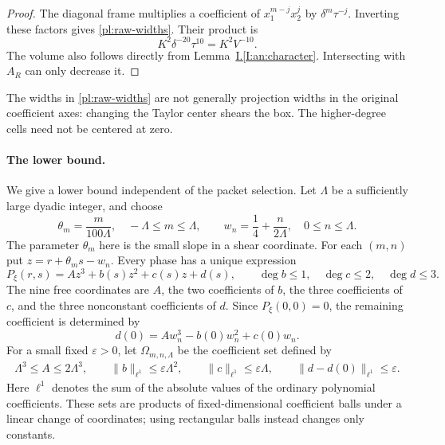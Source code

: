 \documentclass[11pt]{amsart}
\theoremstyle{definition}
\theoremstyle{remark}
\numberwithin{equation}{section}
\newcommand{\partIref}[1]{\hyperref[I:#1]{I.\ref*{I:#1}}}
\begin{document}
\begin{proof}
The diagonal frame multiplies a coefficient of $x_1^{m-j}x_2^j$ by $\delta^m\tau^{-j}$. Inverting these factors gives \eqref{pl:raw-widths}. Their product is
\begin{equation}\label{pl:width-product}
K^2\delta^{-20}\tau^{10}=K^2V^{-10}.
\end{equation}
The volume also follows directly from Lemma~\partIref{an:character}. Intersecting with $A_R$ can only decrease it.
\end{proof}

The widths in \eqref{pl:raw-widths} are not generally projection widths in the original coefficient axes: changing the Taylor center shears the box. The higher-degree cells need not be centered at zero.

\paragraph{The lower bound.}\label{pl:sharpness}
We give a lower bound independent of the packet selection. Let $\Lambda$ be a sufficiently large dyadic integer, and choose
\begin{equation}\label{pl:lower-grids}
\theta_m=\frac{m}{100\Lambda},\quad -\Lambda\le m\le\Lambda,
\qquad w_n=\frac14+\frac{n}{2\Lambda},\quad0\le n\le\Lambda.
\end{equation}
The parameter $\theta_m$ here is the small slope in a shear coordinate. For each $(m,n)$ put $z=r+\theta_ms-w_n$. Every phase has a unique expression
\begin{equation}\label{pl:lower-normal-form}
P_\xi(r,s)=Az^3+b(s)z^2+c(s)z+d(s),
\qquad \deg b\le1,\quad\deg c\le2,\quad\deg d\le3.
\end{equation}
The nine free coordinates are $A$, the two coefficients of $b$, the three coefficients of $c$, and the three nonconstant coefficients of $d$. Since $P_\xi(0,0)=0$, the remaining coefficient is determined by
\[
d(0)=Aw_n^3-b(0)w_n^2+c(0)w_n.
\]
For a small fixed $\varepsilon>0$, let $\Omega_{m,n,\Lambda}$ be the coefficient set defined by
\begin{equation}\label{pl:lower-box}
\begin{split}
\Lambda^3\le A\le2\Lambda^3,\qquad
\|b\|_{\ell^1}\le\varepsilon\Lambda^2,\qquad
\|c\|_{\ell^1}\le\varepsilon\Lambda,\qquad
\|d-d(0)\|_{\ell^1}\le\varepsilon.
\end{split}
\end{equation}
Here $\ell^1$ denotes the sum of the absolute values of the ordinary polynomial coefficients. These sets are products of fixed-dimensional coefficient balls under a linear change of coordinates; using rectangular balls instead changes only constants.
\end{document}
